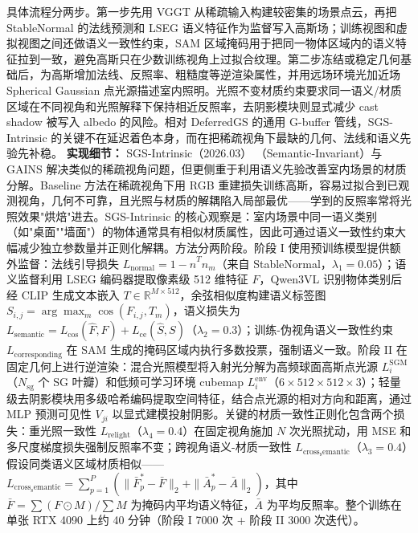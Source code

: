具体流程分两步。第一步先用 VGGT 从稀疏输入构建较密集的场景点云，再把 StableNormal 的法线预测和 LSEG 语义特征作为监督写入高斯场；训练视图和虚拟视图之间还做语义一致性约束，SAM 区域掩码用于把同一物体区域内的语义特征拉到一致，避免高斯只在少数训练视角上过拟合纹理。第二步冻结或稳定几何基础后，为高斯增加法线、反照率、粗糙度等逆渲染属性，并用远场环境光加近场 Spherical Gaussian 点光源描述室内照明。光照不变材质约束要求同一语义/材质区域在不同视角和光照解释下保持相近反照率，去阴影模块则显式减少 cast shadow 被写入 albedo 的风险。相对 DeferredGS 的通用 G-buffer 管线，SGS-Intrinsic 的关键不在延迟着色本身，而在把稀疏视角下最缺的几何、法线和语义先验先补稳。
\textbf{实现细节：} SGS-Intrinsic（2026.03） （Semantic-Invariant）与 GAINS 解决类似的稀疏视角问题，但更侧重于利用语义先验改善室内场景的材质分解。Baseline 方法在稀疏视角下用 RGB 重建损失训练高斯，容易过拟合到已观测视角，几何不可靠，且光照与材质的解耦陷入局部最优——学到的反照率常将光照效果"烘焙"进去。SGS-Intrinsic 的核心观察是：室内场景中同一语义类别（如"桌面""墙面"）的物体通常具有相似材质属性，因此可通过语义一致性约束大幅减少独立参数量并正则化解耦。方法分两阶段。阶段 I 使用预训练模型提供额外监督：法线引导损失 $L_{\mathrm{normal}} = 1 - \hat{n}^T n_m$（来自 StableNormal，$\lambda_1=0.05$）；语义监督利用 LSEG 编码器提取像素级 512 维特征 $F$，Qwen3VL 识别物体类别后经 CLIP 生成文本嵌入 $T \in \mathbb{R}^{M \times 512}$，余弦相似度构建语义标签图 $S_{i,j} = \arg\max_m \cos(F_{i,j}, T_m)$，语义损失为 $L_{\mathrm{semantic}} = L_{\mathrm{cos}}(\hat{F}, F) + L_{\mathrm{ce}}(\hat{S}, S)$（$\lambda_2=0.3$）；训练-伪视角语义一致性约束 $L_{\mathrm{corresponding}}$ 在 SAM 生成的掩码区域内执行多数投票，强制语义一致。阶段 II 在固定几何上进行逆渲染：混合光照模型将入射光分解为高频球面高斯点光源 $L_i^{\mathrm{SGM}}$（$N_{\mathrm{sg}}$ 个 SG 叶瓣）和低频可学习环境 cubemap $L_i^{\mathrm{env}}$（$6 \times 512 \times 512 \times 3$）；轻量级去阴影模块用多级哈希编码提取空间特征，结合点光源的相对方向和距离，通过 MLP 预测可见性 $V_{ji}$ 以显式建模投射阴影。关键的材质一致性正则化包含两个损失：重光照一致性 $L_{\mathrm{relight}}$（$\lambda_4=0.4$）在固定视角施加 $N$ 次光照扰动，用 MSE 和多尺度梯度损失强制反照率不变；跨视角语义-材质一致性 $L_{\mathrm{cross_semantic}}$（$\lambda_3=0.4$）假设同类语义区域材质相似——$L_{\mathrm{cross_semantic}} = \sum_{p=1}^P (\|\bar{F}_p^{*} - \bar{F}\|_2 + \|\bar{A}_p^{*} - \bar{A}\|_2)$，其中 $\bar{F} = \sum(F \odot M) / \sum M$ 为掩码内平均语义特征，$\bar{A}$ 为平均反照率。整个训练在单张 RTX 4090 上约 40 分钟（阶段 I 7000 次 + 阶段 II 3000 次迭代）。
